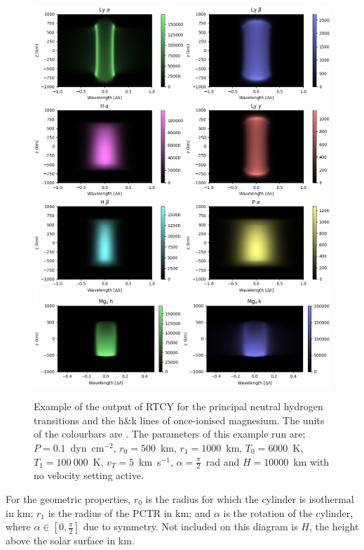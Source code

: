 \begin{figure}
    \centering
    \includegraphics[width=\linewidth]{./03Modelling2D/figs/exh.png}
    \includegraphics[width=\linewidth]{./03Modelling2D/figs/exmg.png}
    \caption[Example of the output of RTCY for the principal neutral hydrogen transitions and the h\&k lines of once-ionised magnesium.]{Example of the output of RTCY for the principal neutral hydrogen transitions and the h\&k lines of once-ionised magnesium. The units of the colourbars are \cgsint. The parameters of this example run are; $P=0.1$~dyn~cm$^{-2}$, $r_0=500$~km, $r_1=1000$~km, $T_0=6000$~K, $T_1=100~000$~K, $v_T=5$~km~s$^{-1}$, $\alpha=\frac{\pi}{2}$~rad and $H=10000$~km with no velocity setting active.}
    \label{fig:introexhmg}
\end{figure}
For the geometric properties, $r_0$ is the radius for which the cylinder is isothermal in km; $r_1$ is the radius of the PCTR in km; and $\alpha$ is the rotation of the cylinder, where $\alpha\in[0,\frac{\pi}{2}]$ due to symmetry. Not included on this diagram is $H$, the height above the solar surface in km. 
